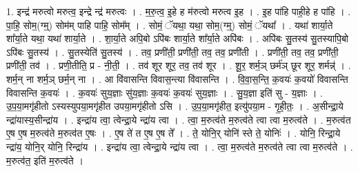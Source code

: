 \documentclass[17pt]{extarticle}
\begin{document}
1. इन्द्र॑ मरुत्वो मरुत्व॒ इन्द्रे न्द्र॑ मरुत्वः । . म॒रु॒त्व॒ इ॒हे ह म॑रुत्वो मरुत्व इ॒ह । . इ॒ह पा॑हि पाही॒हे ह पा॑हि । . पा॒हि॒ सोम॒(ग्म्॒) सोम॑म् पाहि पाहि॒ सोम᳚म् । . सोमं॒ ॅयथा॒ यथा॒ सोम॒(ग्म्॒) सोमं॒ ॅयथा᳚ । . यथा॑ शार्या॒ते शा᳚र्या॒ते यथा॒ यथा॑ शार्या॒ते । . शा॒र्या॒ते अपि॒बो ऽपि॑बः शार्या॒ते शा᳚र्या॒ते अपि॑बः । . अपि॑बः सु॒तस्य॑ सु॒तस्यापि॒बो ऽपि॑बः सु॒तस्य॑ । . सु॒तस्येति॑ सु॒तस्य॑ । . तव॒ प्रणी॑ती॒ प्रणी॑ती॒ तव॒ तव॒ प्रणी॑ती । . प्रणी॑ती॒ तव॒ तव॒ प्रणी॑ती॒ प्रणी॑ती॒ तव॑ । . प्रणी॒तीति॒ प्र - नी॒ती॒ । . तव॑ शूर शूर॒ तव॒ तव॑ शूर । . शू॒र॒ शर्म॒ञ् छर्म॑ञ् छूर शूर॒ शर्मन्न्॑ । . शर्म॒न् ना शर्म॒ञ् छर्म॒न् ना । . आ वि॑वासन्ति विवास॒न्त्या वि॑वासन्ति । . वि॒वा॒स॒न्ति॒ क॒वयः॑ क॒वयो॑ विवासन्ति विवासन्ति क॒वयः॑ । . क॒वयः॑ सुय॒ज्ञाः सु॑य॒ज्ञाः क॒वयः॑ क॒वयः॑ सुय॒ज्ञाः । . सु॒य॒ज्ञा इति॑ सु - य॒ज्ञाः । . उ॒प॒या॒मगृ॑हीतो ऽस्यस्युपया॒मगृ॑हीत उपया॒मगृ॑हीतो ऽसि । . उ॒प॒या॒मगृ॑हीत॒ इत्यु॑पया॒म - गृ॒ही॒तः॒ । . अ॒सीन्द्रा॒ये न्द्रा॑यास्य॒सीन्द्रा॑य । . इन्द्रा॑य त्वा॒ त्वेन्द्रा॒ये न्द्रा॑य त्वा । . त्वा॒ म॒रुत्व॑ते म॒रुत्व॑ते त्वा त्वा म॒रुत्व॑ते । . म॒रुत्व॑त ए॒ष ए॒ष म॒रुत्व॑ते म॒रुत्व॑त ए॒षः । . ए॒ष ते॑ त ए॒ष ए॒ष ते᳚ । . ते॒ योनि॒र् योनि॑ स्ते ते॒ योनिः॑ । . योनि॒ रिन्द्रा॒ये न्द्रा॑य॒ योनि॒र् योनि॒ रिन्द्रा॑य । . इन्द्रा॑य त्वा॒ त्वेन्द्रा॒ये न्द्रा॑य त्वा । . त्वा॒ म॒रुत्व॑ते म॒रुत्व॑ते त्वा त्वा म॒रुत्व॑ते । . म॒रुत्व॑त॒ इति॑ म॒रुत्व॑ते । \newline
\end{document}
